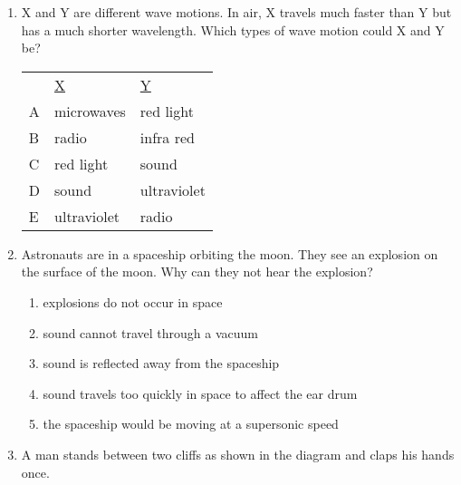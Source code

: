 \begin{enumerate}
\item X and Y are different wave motions. In air, X travels much faster than Y but has a much shorter wavelength. Which types of wave motion could X and Y be?

\begin{tabular}{lll}
& \underline{X} & \underline{Y}\\
A & microwaves & red light\\
B & radio & infra red\\
C & red light & sound\\
D & sound & ultraviolet\\
E & ultraviolet & radio\\
\end{tabular}

\item Astronauts are in a spaceship orbiting the moon. They see an explosion on the surface of the moon. Why can they not hear the explosion?
\begin{enumerate}
\item explosions do not occur in space
\item sound cannot travel through a vacuum
\item sound is reflected away from the spaceship
\item sound travels too quickly in space to affect the ear drum
\item the spaceship would be moving at a supersonic speed
\end{enumerate}

\item A man stands between two cliffs as shown in the diagram and claps his hands once.


\end{enumerate}
